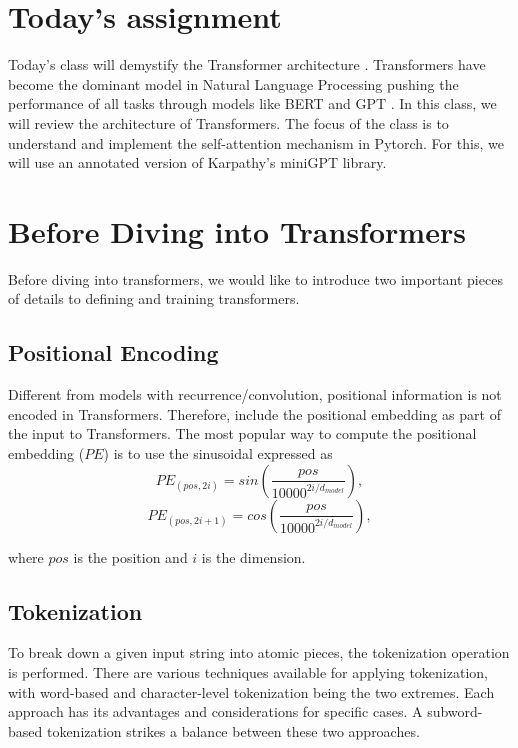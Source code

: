 \section{Today's assignment}
Today's class will demystify the Transformer architecture \cite{vaswani2017attention}. Transformers have become the dominant model in Natural Language Processing pushing the performance of all tasks through models like BERT \cite{devlin2018bert} and GPT \cite{brown2020language}. In this class, we will review the architecture of Transformers. The focus of the class is to understand and implement the self-attention mechanism in Pytorch. For this, we will use an annotated version of Karpathy's miniGPT library.


\section{Before Diving into Transformers}
Before diving into transformers, we would like to introduce two important pieces of details to defining and training transformers.


\subsection{Positional Encoding}
Different from models with recurrence/convolution, positional information is not encoded in Transformers. Therefore, \citet{vaswani2017attention} include the positional embedding as part of the input to Transformers. The most popular way to compute the positional embedding ($PE$) is to use the sinusoidal expressed as
\begin{equation}
        PE_{(pos,2i)} = sin(\frac{pos}{ 10000^{2i/d_{model}}}),
\end{equation}
\begin{equation}
    PE_{(pos,2i+1)} = cos(\frac{pos}{ 10000^{2i/d_{model}}}),
\end{equation}

where $pos$ is the position and $i$ is the dimension.

\subsection{Tokenization}
To break down a given input string into atomic pieces, the tokenization operation is performed. There are various techniques available for applying tokenization, with word-based and character-level tokenization being the two extremes. Each approach has its advantages and considerations for specific cases. A subword-based tokenization strikes a balance between these two approaches.

